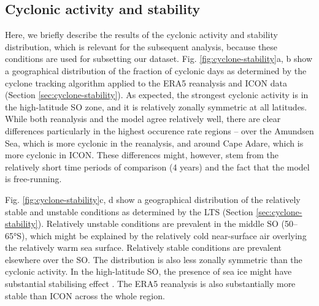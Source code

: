 \documentclass[12pt,a4paper]{article}
\begin{document}
\subsection{Cyclonic activity and stability}

Here, we briefly describe the results of the cyclonic activity and stability
distribution, which is relevant for the subsequent analysis, because these
conditions are used for subsetting our dataset. Fig.
\ref{fig:cyclone-stability}a, b show a geographical distribution of the fraction
of cyclonic days as determined by the cyclone tracking algorithm applied to the
ERA5 reanalysis and ICON data (Section \ref{sec:cyclone-stability}). As
expected, the strongest cyclonic activity is in the high-latitude SO zone, and
it is relatively zonally symmetric at all latitudes.  While both reanalysis and
the model agree relatively well, there are clear differences particularly in the highest occurence rate regions -- over the Amundsen Sea, which is
more cyclonic in the reanalysis, and around Cape Adare, which is more cyclonic
in ICON. These differences might, however, stem from the relatively short time
periods of comparison (4 years) and the fact that the model is free-running.

Fig. \ref{fig:cyclone-stability}c, d show a geographical distribution of the
relatively stable and unstable conditions as determined by the LTS (Section
\ref{sec:cyclone-stability}). Relatively unstable conditions are prevalent
in the middle SO (50--65°S), which might be explained by the relatively cold
near-surface air overlying the relatively warm sea surface. Relatively
stable conditions are prevalent elsewhere over the SO. The distribution is also
less zonally symmetric than the cyclonic activity.  In the high-latitude SO,
the presence of sea ice might have substantial stabilising effect
\citep{knight2024}. The ERA5 reanalysis is also substantially more stable than
ICON across the whole region.
\end{document}
